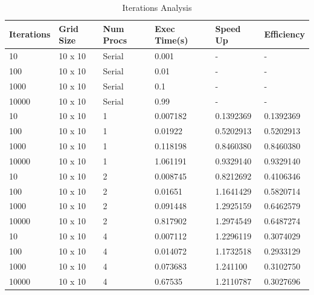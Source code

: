 \documentclass[12pt, letterpaper]{report}
\begin{document}
\begin{table}[H]
	\centering
	\begin{tabular}{ |l|l|l|l|l|l| }
		\hline
		\textbf{Iterations} & \textbf{Grid Size} & \textbf{Num Procs} & \textbf{Exec Time(s)} & \textbf{Speed Up} & \textbf{Efficiency} \\
		\hline \hline \hline
		10 & 10 x 10 & Serial & 0.001 & - & - \\
		\hline
		100 & 10 x 10 & Serial & 0.01 & - & - \\
		\hline
		1000 & 10 x 10 & Serial & 0.1 & - & - \\
		\hline
		10000 & 10 x 10 & Serial & 0.99 & - & - \\
		\hline \hline \hline
		10 & 10 x 10 & 1 & 0.007182 & 0.1392369 & 0.1392369 \\
		\hline
		100 & 10 x 10 & 1 & 0.01922 & 0.5202913 & 0.5202913 \\
		\hline
		1000 & 10 x 10 & 1 & 0.118198 & 0.8460380 & 0.8460380 \\
		\hline
		10000 & 10 x 10 & 1 & 1.061191 & 0.9329140 & 0.9329140 \\
		\hline \hline \hline
		10 & 10 x 10 & 2 & 0.008745 & 0.8212692 & 0.4106346 \\
		\hline
		100 & 10 x 10 & 2 & 0.01651 & 1.1641429 & 0.5820714 \\
		\hline
		1000 & 10 x 10 & 2 & 0.091448 & 1.2925159 & 0.6462579 \\
		\hline
		10000 & 10 x 10 & 2 & 0.817902 & 1.2974549 & 0.6487274 \\
		\hline \hline \hline
		10 & 10 x 10 & 4 & 0.007112 & 1.2296119 & 0.3074029 \\
		\hline
		100 & 10 x 10 & 4 & 0.014072 & 1.1732518 & 0.2933129 \\
		\hline
		1000 & 10 x 10 & 4 & 0.073683 & 1.241100 & 0.3102750 \\
		\hline
		10000 & 10 x 10 & 4 & 0.67535 & 1.2110787 & 0.3027696 \\
		\hline
	\end{tabular}
	\caption{Iterations Analysis}
\end{table}
\end{document}
